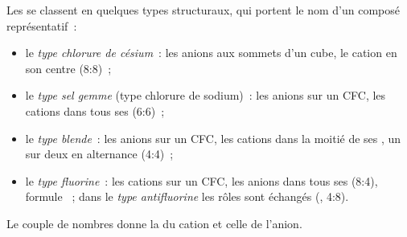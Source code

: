 \begin{definition}\label{def:b1:crystals-ionic-covalent:structure-type}
Les  se classent en quelques types structuraux, qui
portent le nom d'un composé représentatif~:
\begin{itemize}
  \item le \emph{type chlorure de césium}~: les anions
        aux sommets d'un cube, le cation en son centre (8:8)~;
  \item le \emph{type sel gemme} (type chlorure de
        sodium)~: les anions sur un  CFC, les cations dans tous ses
         (6:6)~;
  \item le \emph{type blende}~: les anions sur un
         CFC, les cations dans la moitié de ses ,
        un sur deux en alternance (4:4)~;
  \item le \emph{type fluorine}~: les cations sur un
         CFC, les anions dans tous ses  (8:4),
        formule ~; dans le \emph{type antifluorine}
        les rôles sont échangés (, 4:8).
\end{itemize}
Le couple de nombres donne la  du cation et celle de l'anion.
\end{definition}

